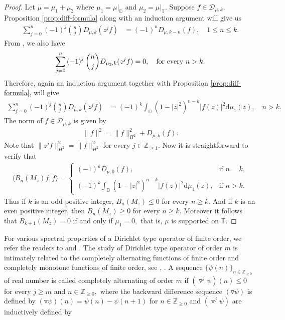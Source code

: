 \documentclass[10pt,oneside,reqno]{amsart}
\theoremstyle{definition}
\theoremstyle{remark}
\newcommand{\abs}[1]{\left\lvert #1 \right\rvert}
\newcommand{\D}{\mathbb D}
\newcommand{\T}{\mathbb T}
\numberwithin{equation}{section}
\begin{document}
    \begin{proof}
     Let $\mu=\mu_1+\mu_2$ where $\mu_1 = \mu |_{\D}$ and $\mu_2 = \mu |_{\T}$. Suppose $f\in \mathscr D_{\mu, k}.$  Proposition \ref{prop:diff-formula} along with an induction argument will give us 
\begin{align}\label{Less difference}
  \sum_{j=0}^{n} \left( -1 \right)^{j} \binom{n}{j} D_{\mu,k}(z^{j}f) 
&= \left( -1 \right)^{n} D_{\mu, k-n} \left( f \right),\quad 1\leqslant n\leqslant k.  
\end{align}
From \cite[Eq. (4.1), p.461]{GGR22}, we also have
 \begin{align*}
     \sum_{j=0}^{n} \left( -1 \right)^{j} \binom{n}{j} D_{\mu_2,k}(z^{j}f)= 0,\quad \mbox{for every\,}\, n> k.
 \end{align*}
 Therefore, again an induction argument together with Proposition \ref{prop:diff-formula}, will give 
   \begin{align}\label{more difference}
  \sum_{j=0}^{n} \left( -1 \right)^{j} \binom{n}{j}  D_{\mu,k}(z^{j}f)  &= \left( -1 \right)^{k} \int_{\D} \left( 1-\abs{z}^{2} \right)^{n-k} \abs{f\left( z \right)}^{2} \mathrm{d}\mu_1 \left( z \right),\quad n > k. 
\end{align}  
The norm of $f\in\mathscr D_{\mu,k}$ is given by
\begin{align*}
    \|f\|^2= \|f\|_{H^2}^2 + D_{\mu,k}(f).
\end{align*}
 Note that $\|z^jf\|_{H^2}^2=\|f\|_{H^2}^2$ for every $j\in \mathbb Z_{\geqslant 1}.$ Now it is straightforward to verify that 
     \begin{align*}
        \langle B_n(M_z)f,f\rangle = \begin{cases}
            (-1)^kD_{\mu,0}(f), & \mbox{if}\,\,n=k,\\
            \left( -1 \right)^{k} \displaystyle \int_{\D} \left( 1-\abs{z}^{2} \right)^{n-k} \abs{f\left( z \right)}^{2} \mathrm{d}\mu_1 \left( z \right), &  \mbox{if}\,\, n > k.
        \end{cases}
     \end{align*}
     Thus if $k$ is an odd positive integer, $B_n(M_z)\leqslant 0$ for every $n\geqslant k.$ And if $k$ is an even positive integer, then $B_n(M_z)\geqslant 0$ for every $n\geqslant k.$ Moreover it follows that $B_{k+1}(M_z)=0$ if and only if $\mu_1=0,$ that is, $\mu$ is supported on $\mathbb T.$
    \end{proof}
For various spectral properties of a Dirichlet type operator of finite order, we refer the readers to \cite[Sec. 4]{CMF} and \cite[Sec. 3]{CS17}.  The study of Dirichlet type operator of order $m$ is intimately related to the completely alternating functions of finite order and completely monotone functions of finite order,  see \cite[Sec. 2]{CS17}, \cite[Sec. 3]{CMF}. A sequence $\{\psi(n)\}_{n \in \mathbb Z_{\geqslant 0}}$ of real number is called completely alternating of order $m$ if $(\triangledown^j \psi)(n) \leqslant 0$ for every $j\geqslant m$ and $n\in \mathbb Z_{\geqslant 0},$ where the backward difference sequence $(\triangledown \psi)$ is defined by $(\triangledown \psi)(n)= \psi(n)-\psi(n+1)$ for $n\in \mathbb Z_{\geqslant 0}$ and $(\triangledown ^j\psi)$ are inductively defined by 
\end{document}
